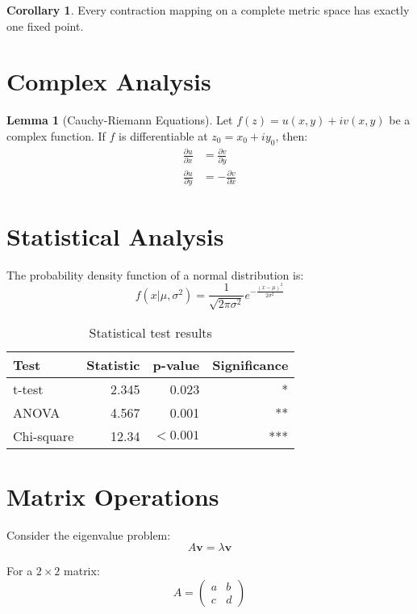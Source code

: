 \documentclass{article}
\theoremstyle{definition}
\newtheorem{lemma}[theorem]{Lemma}
\newtheorem{corollary}[theorem]{Corollary}
\theoremstyle{remark}
\begin{document}
\begin{corollary}
Every contraction mapping on a complete metric space has exactly one fixed point.
\end{corollary}

\section{Complex Analysis}

\begin{lemma}[Cauchy-Riemann Equations]
Let $f(z) = u(x,y) + iv(x,y)$ be a complex function. If $f$ is differentiable at $z_0 = x_0 + iy_0$, then:
\begin{align}
\frac{\partial u}{\partial x} &= \frac{\partial v}{\partial y} \\
\frac{\partial u}{\partial y} &= -\frac{\partial v}{\partial x}
\end{align}
\end{lemma}

\section{Statistical Analysis}

The probability density function of a normal distribution is:
\[
f(x|\mu,\sigma^2) = \frac{1}{\sqrt{2\pi\sigma^2}} e^{-\frac{(x-\mu)^2}{2\sigma^2}}
\]

\begin{table}[h]
\centering
\caption{Statistical test results}
\begin{tabular}{lrrr}
\toprule
Test & Statistic & p-value & Significance \\
\midrule
t-test & 2.345 & 0.023 & * \\
ANOVA & 4.567 & 0.001 & ** \\
Chi-square & 12.34 & $< 0.001$ & *** \\
\bottomrule
\end{tabular}
\end{table}

\section{Matrix Operations}

Consider the eigenvalue problem:
\[
A\mathbf{v} = \lambda\mathbf{v}
\]

For a $2 \times 2$ matrix:
\[
A = \begin{pmatrix}
a & b \\
c & d
\end{pmatrix}
\]
\end{document}

